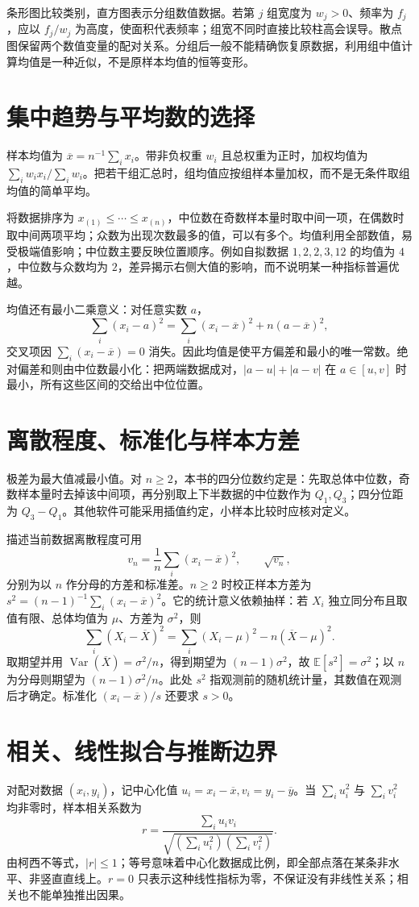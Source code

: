 \documentclass[UTF8]{ctexbook}
\begin{document}
条形图比较类别，直方图表示分组数值数据。若第 $j$ 组宽度为 $w_j>0$、频率为 $f_j$，应以 $f_j/w_j$ 为高度，使面积代表频率；组宽不同时直接比较柱高会误导。散点图保留两个数值变量的配对关系。分组后一般不能精确恢复原数据，利用组中值计算均值是一种近似，不是原样本均值的恒等变形。

\section{集中趋势与平均数的选择}
样本均值为 $\overline x=n^{-1}\sum_i x_i$。带非负权重 $w_i$ 且总权重为正时，加权均值为 $\sum_iw_ix_i/\sum_iw_i$。把若干组汇总时，组均值应按组样本量加权，而不是无条件取组均值的简单平均。

将数据排序为 $x_{(1)}\le\cdots\le x_{(n)}$，中位数在奇数样本量时取中间一项，在偶数时取中间两项平均；众数为出现次数最多的值，可以有多个。均值利用全部数值，易受极端值影响；中位数主要反映位置顺序。例如自拟数据 $1,2,2,3,12$ 的均值为 $4$，中位数与众数均为 $2$，差异揭示右侧大值的影响，而不说明某一种指标普遍优越。

均值还有最小二乘意义：对任意实数 $a$，
\[
 \sum_i(x_i-a)^2=\sum_i(x_i-\overline x)^2+n(a-\overline x)^2,
\]
交叉项因 $\sum_i(x_i-\overline x)=0$ 消失。因此均值是使平方偏差和最小的唯一常数。绝对偏差和则由中位数最小化：把两端数据成对，$|a-u|+|a-v|$ 在 $a\in[u,v]$ 时最小，所有这些区间的交给出中位位置。

\section{离散程度、标准化与样本方差}
极差为最大值减最小值。对 $n\ge2$，本书的四分位数约定是：先取总体中位数，奇数样本量时去掉该中间项，再分别取上下半数据的中位数作为 $Q_1,Q_3$；四分位距为 $Q_3-Q_1$。其他软件可能采用插值约定，小样本比较时应核对定义。

描述当前数据离散程度可用
\[
 v_n=\frac1n\sum_i(x_i-\overline x)^2,\qquad
 \sqrt{v_n},
\]
分别为以 $n$ 作分母的方差和标准差。$n\ge2$ 时校正样本方差为 $s^2=(n-1)^{-1}\sum_i(x_i-\overline x)^2$。它的统计意义依赖抽样：若 $X_i$ 独立同分布且取值有限、总体均值为 $\mu$、方差为 $\sigma^2$，则
\[
 \sum_i(X_i-\overline X)^2=\sum_i(X_i-\mu)^2-n(\overline X-\mu)^2.
\]
取期望并用 $\operatorname{Var}(\overline X)=\sigma^2/n$，得到期望为 $(n-1)\sigma^2$，故 $\mathbb E[s^2]=\sigma^2$；以 $n$ 为分母则期望为 $(n-1)\sigma^2/n$。此处 $s^2$ 指观测前的随机统计量，其数值在观测后才确定。标准化 $(x_i-\overline x)/s$ 还要求 $s>0$。

\section{相关、线性拟合与推断边界}
对配对数据 $(x_i,y_i)$，记中心化值 $u_i=x_i-\overline x,v_i=y_i-\overline y$。当 $\sum_i u_i^2$ 与 $\sum_i v_i^2$ 均非零时，样本相关系数为
\[
 r=\frac{\sum_i u_iv_i}{\sqrt{(\sum_i u_i^2)(\sum_i v_i^2)}}.
\]
由柯西不等式，$|r|\le1$；等号意味着中心化数据成比例，即全部点落在某条非水平、非竖直直线上。$r=0$ 只表示这种线性指标为零，不保证没有非线性关系；相关也不能单独推出因果。
\end{document}
